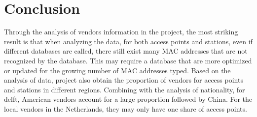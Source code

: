 \section{Conclusion}
Through the analysis of vendors information in the project, the most striking result is that when analyzing the data, for both access points and stations, even if different databases are called, there still exist many MAC addresses that are not recognized by the database. This may require a database that are more optimized or updated for the growing number of MAC addresses typed. Based on the analysis of data, project also obtain the proportion of vendors for access points and stations in different regions. Combining with the analysis of nationality, for delft, American vendors account for a large proportion followed by China. For the local vendors in the Netherlands, they may only have one share of access points.